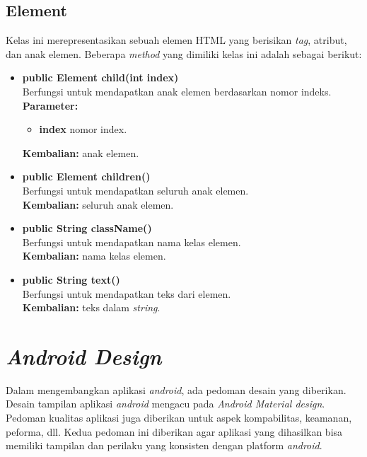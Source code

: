 \subsection{Element}

Kelas ini merepresentasikan sebuah elemen HTML yang berisikan \textit{tag}, atribut, dan anak elemen. Beberapa \textit{method} yang dimiliki kelas ini adalah sebagai berikut:
\begin{itemize}
	\item \textbf{public Element child(int index)} \\
		Berfungsi untuk mendapatkan anak elemen berdasarkan nomor indeks. \\
		\textbf{Parameter:} 
		\begin{itemize}
			\item \textbf{index} nomor index.
		\end{itemize}
		\textbf{Kembalian:} anak elemen.	
		
		\item \textbf{public Element children()} \\
		Berfungsi untuk mendapatkan seluruh anak elemen. \\
		\textbf{Kembalian:} seluruh anak elemen.	
		
		\item \textbf{public String className()} \\
		Berfungsi untuk mendapatkan nama kelas elemen. \\
		\textbf{Kembalian:} nama kelas elemen.	
		
		\item \textbf{public String text()} \\
		Berfungsi untuk mendapatkan teks dari elemen. \\
		\textbf{Kembalian:} teks dalam \textit{string}.	
\end{itemize}


\section{\textit{Android Design}}
\label{sec:android design}
Dalam mengembangkan aplikasi \textit{android}, ada pedoman desain yang diberikan. Desain tampilan aplikasi \textit{android} mengacu pada \textit{Android Material design}. Pedoman kualitas aplikasi juga diberikan untuk aspek kompabilitas, keamanan, peforma, dll. Kedua pedoman ini diberikan agar aplikasi yang dihasilkan bisa memiliki tampilan dan perilaku yang konsisten dengan platform \textit{android}. 
 
